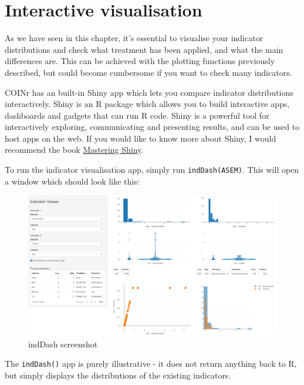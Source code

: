 \documentclass[
]{book}
\begin{document}
\hypertarget{interactive-visualisation}{%
\section{Interactive visualisation}\label{interactive-visualisation}}

As we have seen in this chapter, it's essential to visualise your indicator distributions and check what treatment has been applied, and what the main differences are. This can be achieved with the plotting functions previously described, but could become cumbersome if you want to check many indicators.

COINr has an built-in Shiny app which lets you compare indicator distributions interactively. Shiny is an R package which allows you to build interactive apps, dashboards and gadgets that can run R code. Shiny is a powerful tool for interactively exploring, communicating and presenting results, and can be used to host apps on the web. If you would like to know more about Shiny, I would recommend the book \href{https://mastering-shiny.org/index.html}{Mastering Shiny}.

To run the indicator visualisation app, simply run \texttt{indDash(ASEM)}. This will open a window which should look like this:

\begin{figure}

{\centering \includegraphics[width=1\linewidth]{images/inddash_screenshot} 

}

\caption{indDash screenshot}\label{fig:unnamed-chunk-64}
\end{figure}

The \texttt{indDash()} app is purely illustrative - it does not return anything back to R, but simply displays the distributions of the existing indicators.
\end{document}
